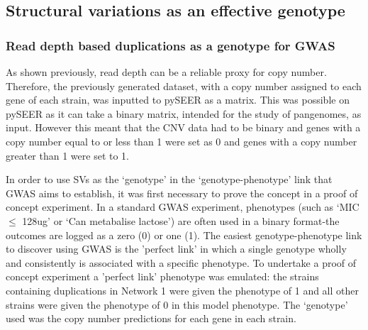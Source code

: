 \documentclass{article}
\begin{document}
\subsection{Structural variations as an effective genotype}


\subsubsection{Read depth based duplications as a genotype for GWAS}

As shown previously, read depth can be a reliable proxy for copy number. Therefore, the previously generated dataset, with a copy number assigned to each gene of each strain, was inputted to pySEER as a matrix. This was possible on pySEER as it can take a binary matrix, intended for the study of pangenomes, as input. However this meant that the CNV data had to be binary and genes with a copy number equal to or less than 1 were set as 0 and genes with a copy number greater than 1 were set to 1.


In order to use SVs as the ‘genotype’ in the ‘genotype-phenotype’ link that GWAS aims to establish, it was first necessary to prove the concept in a proof of concept experiment. In a standard GWAS experiment, phenotypes (such as `MIC $\leq$ 128ug' or `Can metabalise lactose') are often used in a binary format-the outcomes are logged as a zero (0) or one (1). The easiest genotype-phenotype link to discover using GWAS is the 'perfect link' in which a single genotype wholly and consistently is associated with a specific phenotype. To undertake a proof of concept experiment a 'perfect link' phenotype was emulated: the strains containing duplications in Network 1 were given the phenotype of 1 and all other strains were given the phenotype of 0 in this model phenotype. The `genotype' used was the copy number predictions for each gene in each strain.

\end{document}
